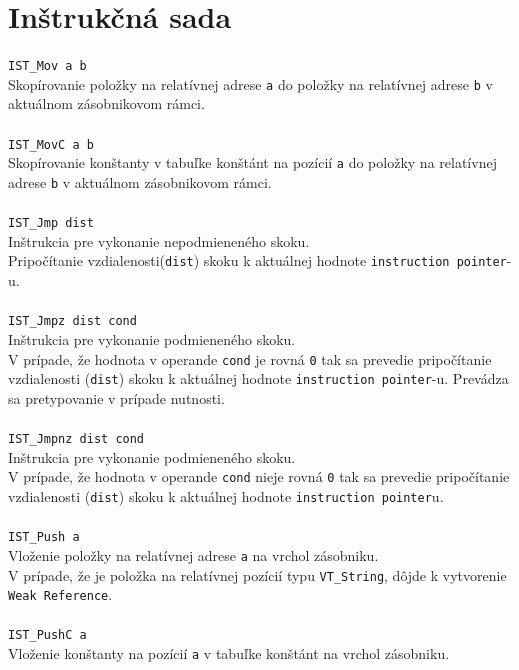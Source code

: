 \documentclass[12pt,a4paper,titlepage,final]{article}
\begin{document}
\section{Inštrukčná sada}

\texttt{IST\_Mov a b}\\
Skopírovanie položky na relatívnej adrese \texttt{a} do položky na relatívnej adrese \texttt{b} v aktuálnom zásobnikovom rámci. \\
\\\texttt{IST\_MovC a b} \\
Skopírovanie konštanty v tabuľke konštánt na pozícií \texttt{a} do položky na relatívnej adrese \texttt{b} v aktuálnom zásobnikovom rámci. \\
\\\texttt{IST\_Jmp dist}\\
Inštrukcia pre vykonanie nepodmieneného skoku.\\
Pripočítanie vzdialenosti(\texttt{dist}) skoku k aktuálnej hodnote \texttt{instruction pointer}-u.\\
\\\texttt{IST\_Jmpz dist cond}\\
Inštrukcia pre vykonanie podmieneného skoku.\\
V prípade, že hodnota v operande \texttt{cond} je rovná \texttt{0} tak sa prevedie
pripočítanie vzdialenosti (\texttt{dist}) skoku k aktuálnej hodnote \texttt{instruction pointer}-u.
Prevádza sa pretypovanie v prípade nutnosti.\\
\\\texttt{IST\_Jmpnz dist cond}\\
Inštrukcia pre vykonanie podmieneného skoku.\\
V prípade, že hodnota v operande \texttt{cond} nieje rovná \texttt{0} tak sa prevedie
pripočítanie vzdialenosti (\texttt{dist}) skoku k aktuálnej hodnote \texttt{instruction pointer}u. \\
\\\texttt{IST\_Push a}\\
Vloženie položky na relatívnej adrese \texttt{a} na vrchol zásobniku.\\
V prípade, že je položka na relatívnej pozícií typu \texttt{VT\_String}, dôjde k vytvorenie \texttt{Weak Reference}.\\
\\\texttt{IST\_PushC a}\\
Vloženie konštanty na pozícií \texttt{a} v tabuľke konštánt na vrchol zásobniku.\\
\end{document}
